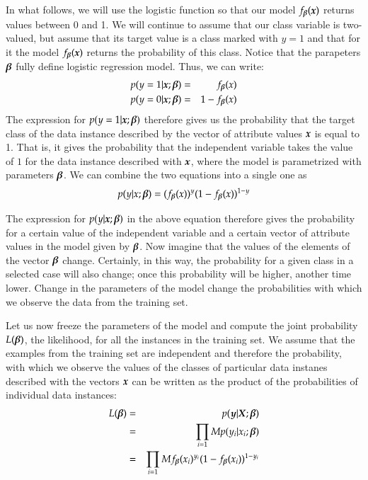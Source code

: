 \begin{refsection}
In what follows, we will use the logistic function so that our model $f_{\boldsymbol{\beta}}(\boldsymbol{x})$ returns values between 0 and 1. We will continue to assume that our class variable is two-valued, but assume that its target value is a class marked with $y=1$ and that for it the model $f_{\boldsymbol{\beta}} (\boldsymbol{x})$ returns the probability of this class. Notice that the parapeters $\boldsymbol{\beta}$ fully define logistic regression model. Thus, we can write:
\begin{eqnarray}
  p(y=1|\boldsymbol{x};\boldsymbol{\beta}) & = & f_{\boldsymbol{\beta}}(x) \\
  p(y=0|\boldsymbol{x};\boldsymbol{\beta}) & = & 1-f_{\boldsymbol{\beta}}(x)
\end{eqnarray}
The expression for $p(y=1|\boldsymbol{x};\boldsymbol{\beta}) $ therefore gives us the probability that the target class of the data instance described by the vector of attribute values $\boldsymbol{x}$ is equal to 1. That is, it gives the probability that the independent variable takes the value of $1$ for the data instance described with $\boldsymbol{x}$, where the model is parametrized with parameters $\boldsymbol{\beta}$. We can combine the two equations into a single one as
\begin{equation}
  p(y|x;\boldsymbol{\beta}) = (f_{\boldsymbol{\beta}}(x))^y(1-f_{\boldsymbol{\beta}}(x))^{1-y}
\label{eq:log-prob}
\end{equation}

The expression for $p(y|\boldsymbol{x};\boldsymbol{\beta}) $ in the above equation therefore gives the probability for a certain value of the independent variable and a certain vector of attribute values in the model given by $\boldsymbol{\beta}$. Now imagine that the values of the elements of the vector $\boldsymbol{\beta}$ change. Certainly, in this way, the probability for a given class in a selected case will also change; once this probability will be higher, another time lower. Change in the parameters of the model change the probabilities with which we observe the data from the training set.

Let us now freeze the parameters of the model and compute the joint probability $L(\boldsymbol{\beta})$, the likelihood, for all the instances in the training set. We assume that the examples from the training set are independent and therefore the probability, with which we observe the values of the classes of particular data instanes described with the vectors $\boldsymbol{x}$ can be written as the product of the probabilities of individual data instances:
\begin{eqnarray}
  L(\boldsymbol{\beta}) & = & p(\boldsymbol{y}|\boldsymbol{X};\boldsymbol{\beta}) \nonumber\\
  & = & \prod_{i=1}M p(y_i|x_i;\boldsymbol{\beta}) \nonumber\\
  & = & \prod_{i=1}M f_{\boldsymbol{\beta}}(x_i)^{y_i}(1-f_{\boldsymbol{\beta}}(x_i))^{1-y_i}
\end{eqnarray}


\end{refsection}
